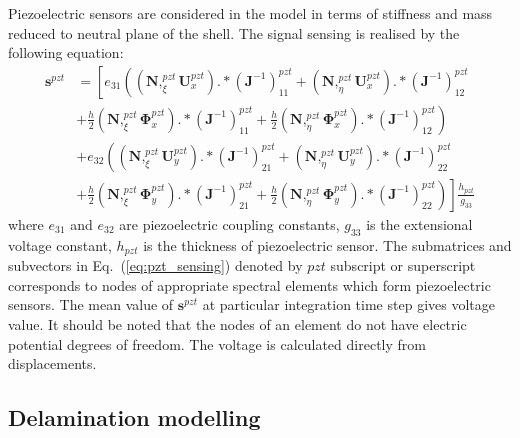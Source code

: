 \documentclass[preprint,12pt]{elsarticle}
\renewcommand{\vec}[1]{\mathbf{#1}}
\renewcommand{\bm}[1]{\mathbf{#1}}
\newcommand{\bs}[1]{\boldsymbol{#1}}
\begin{document}
	Piezoelectric sensors are considered in the model in terms of stiffness and mass reduced to neutral plane of the shell. The signal sensing is realised by the following equation:
	\begin{equation}
	\begin{split}
	\vec{s}^{pzt} &= \left[ e_{31}\left((\bm{N},_{\xi}^{pzt}\vec{U}_x^{pzt}).*(\vec{J}^{-1})_{11}^{pzt} + (\bm{N},_{\eta}^{pzt}\vec{U}_x^{pzt}).*(\vec{J}^{-1})_{12}^{pzt} \right.\right.\\
	&+ \frac{h}{2} (\bm{N},_{\xi}^{pzt}\bs{\Phi}_x^{pzt}).*(\vec{J}^{-1})_{11}^{pzt} + \frac{h}{2} \left.(\bm{N},_{\eta}^{pzt}\bs{\Phi}_x^{pzt}).*(\vec{J}^{-1})_{12}^{pzt}\right)\\
	&+ e_{32}\left((\bm{N},_{\xi}^{pzt}\vec{U}_y^{pzt}).*(\vec{J}^{-1})_{21}^{pzt} + (\bm{N},_{\eta}^{pzt}\vec{U}_y^{pzt}).*(\vec{J}^{-1})_{22}^{pzt} \right.\\
	&+ \frac{h}{2} (\bm{N},_{\xi}^{pzt}\bs{\Phi}_y^{pzt}).*(\vec{J}^{-1})_{21}^{pzt} + \frac{h}{2} \left.\left.(\bm{N},_{\eta}^{pzt}\bs{\Phi}_y^{pzt}).*(\vec{J}^{-1})_{22}^{pzt}\right)\right] \frac{h_{pzt}}{g_{33}} 
	\end{split}
	\label{eq:pzt_sensing}
	\end{equation}
	where $e_{31}$ and $e_{32}$ are piezoelectric coupling constants, $g_{33}$ is the extensional voltage constant, $h_{pzt}$ is the thickness of piezoelectric sensor. The submatrices and subvectors in Eq.~(\ref{eq:pzt_sensing}) denoted by $pzt$ subscript or superscript corresponds to nodes of appropriate spectral elements which form piezoelectric sensors. The mean value of $\vec{s}^{pzt}$ at particular integration time step gives voltage value. It should be noted that the nodes of an element do not have electric potential degrees of freedom. The voltage is calculated directly from displacements.
	
	\subsection{Delamination modelling \label{sec:delam_model}}
	
\end{document}
